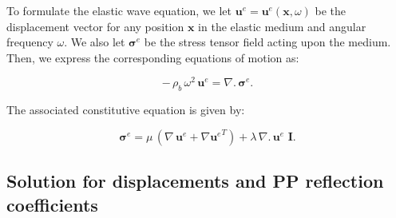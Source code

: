 \documentclass[draft]{agujournal2019}
\begin{document}
To formulate the elastic wave equation, we let $\bm{u}^e=\bm{u}^e (\bm{x},\omega)$ be the displacement vector for any position $\bm{x}$ in the elastic medium and angular frequency $\omega$. We also let $\bm{\sigma}^e$ be the stress tensor field acting upon the medium. Then, we express the corresponding equations of motion as:
\begin{linenomath*}
\begin{equation}\label{Eq.6}
- \, \rho_b \,\omega^2 \, \bm{u}^e = \nabla . \, \bm{\sigma}^e.
\end{equation}
\end{linenomath*}
The associated constitutive equation is given by: 
\begin{linenomath*}
\begin{equation}\label{Eq.7}
\bm{\sigma}^e = \mu \,  \left( \nabla \, \bm{u}^e + {\nabla  \bm{u}^e}^T  \right) + \lambda \,  \nabla . \, \bm{u}^e\,\, \bm{I}.
\end{equation}
\end{linenomath*}
 

\subsection{Solution for displacements and PP reflection coefficients}
\end{document}
